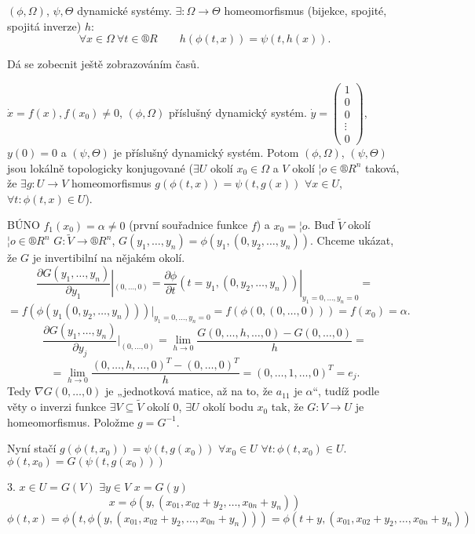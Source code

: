 \documentclass[12pt]{article}					%
\begin{document}
\begin{definice}
	$(\phi, \Omega)$, $\psi, \Theta$ dynamické systémy. $\exists: \Omega \rightarrow \Theta$ homeomorfismus (bijekce, spojité, spojitá inverze) $h$:
	$$ \forall x \in \Omega\ \forall t \in ®R \qquad h(\phi(t, x)) = \psi(t, h(x)). $$
\end{definice}

\begin{poznamka}
	Dá se zobecnit ještě zobrazováním časů.
\end{poznamka}

\begin{veta}[O rektifikaci]
	$\dot{x} = f(x), f(x_0) ≠ 0$, $(\phi, \Omega)$ příslušný dynamický systém. $\dot{y} = \begin{pmatrix} 1 \\ 0 \\ 0 \\ \vdots \\ 0 \end{pmatrix}$, $y(0) = 0$ a $(\psi, \Theta)$ je příslušný dynamický systém. Potom $(\phi, \Omega)$, $(\psi, \Theta)$ jsou lokálně topologicky konjugované ($\exists U$ okolí $x_0 \in \Omega$ a $V$ okolí $¦o \in ®R^n$ taková, že $\exists g: U \rightarrow V$ homeomorfismus $g(\phi(t, x)) = \psi(t, g(x))$ $\forall x \in U$, $\forall t: \phi(t, x) \in U$).

	\begin{dukazin}
		BÚNO $f_1(x_0) = \alpha ≠ 0$ (první souřadnice funkce $f$) a $x_0 = ¦o$. Buď $\tilde{V}$ okolí $¦o \in ®R^n$ $G: \tilde{V} \rightarrow ®R^n$, $G(y_1, …, y_n) = \phi(y_1, (0, y_2, …, y_n))$. Chceme ukázat, že $G$ je invertibilní na nějakém okolí.
		$$ \frac{\partial G(y_1, …, y_n)}{\partial y_1} |_{(0, …, 0)} = \frac{\partial \phi}{\partial t}(t = y_1, (0, y_2, …, y_n)) |_{y_1=0, …, y_n=0} = $$
		$$ = f(\phi(y_1 (0, y_2, …, y_n)))|_{y_1 = 0, …, y_n = 0} = f(\phi(0, (0, …, 0))) = f(x_0) = \alpha. $$
		$$ \frac{\partial G(y_1, …, y_n)}{\partial y_j} |_{(0, …, 0)} = \lim_{h \rightarrow 0} \frac{G(0, …, h, …, 0) - G(0, …, 0)}{h} = $$
		$$ = \lim_{h\rightarrow 0} \frac{(0, …, h, …, 0)^T - (0, …, 0)^T}{h} = (0, …, 1, …, 0)^T = e_j. $$
		Tedy $\nabla G(0, …, 0)$ je „jednotková matice, až na to, že $a_{11}$ je $\alpha$“, tudíž podle věty o inverzi funkce $\exists V \subseteq \tilde{V}$ okolí 0, $\exists U$ okolí bodu $x_0$ tak, že $G: V \rightarrow U$ je homeomorfismus. Položme $g = G^{-1}$.

		Nyní stačí $g(\phi(t, x_0)) = \psi(t, g(x_0))$ $\forall x_0 \in U$ $\forall t: \phi(t, x_0) \in U$. $\phi(t, x_0) = G(\psi(t, g(x_0)))$

		3. $x \in U = G(V)$ $\exists y \in V$ $x = G(y)$
		$$ x = \phi(y, (x_{01}, x_{02} + y_2, …, x_{0n} + y_n)) $$
		$$ \phi(t, x) = \phi(t, \phi(y, (x_{01}, x_{02} + y_2, …, x_{0n} + y_n))) = \phi(t + y, (x_{01}, x_{02} + y_2, …, x_{0n} + y_n)) $$
	\end{dukazin}
\end{veta}
\end{document}
